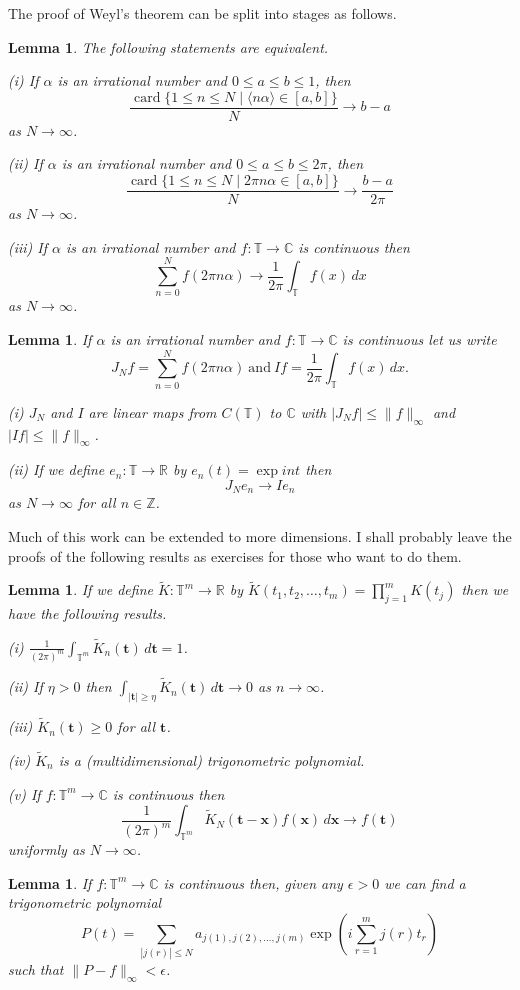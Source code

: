 \documentclass[12pt]{article}
\newtheorem{lemma}[theorem]{Lemma}
\theoremstyle{definition}
\newcommand{\card}{\operatorname{card}}
\begin{document}
The proof of Weyl's theorem can be split into stages as follows.
\begin{lemma} The following statements are equivalent.

(i) If $\alpha$ is an irrational
number and $0\leq a\leq b\leq 1$, then
\[\frac{\card\{1\leq n\leq N \mid \langle n\alpha\rangle
\in [a,b]\}}{N}
\rightarrow b-a\]
as $N\rightarrow\infty$.

(ii) If $\alpha$ is an irrational
number and $0\leq a\leq b\leq 2\pi$, then
\[\frac{\card\{1\leq n\leq N \mid  2\pi n\alpha
\in [a,b]\}}{N}
\rightarrow \frac{b-a}{2\pi}\]
as $N\rightarrow\infty$. 

(iii) If $\alpha$ is an irrational
number and $f:{\mathbb T}\rightarrow{\mathbb C}$
is continuous then
\[\sum_{n=0}^{N}f(2\pi n\alpha)\rightarrow
\frac{1}{2\pi}\int_{\mathbb T}f(x)\,dx\]
as $N\rightarrow\infty$.
\end{lemma}
\begin{lemma} If $\alpha$ is an irrational
number and $f:{\mathbb T}\rightarrow{\mathbb C}$
is continuous let us write
\[J_{N}f=\sum_{n=0}^{N}f(2\pi n\alpha)
\ \text{and}
\ If=\frac{1}{2\pi}\int_{\mathbb T}f(x)\,dx.\]

(i) $J_{N}$ and $I$ are linear maps from $C({\mathbb T})$
to ${\mathbb C}$ with $|J_{N}f|\leq\|f\|_{\infty}$
and $|If|\leq\|f\|_{\infty}$.

(ii) If we define $e_{n}:{\mathbb T}\rightarrow{\mathbb R}$
by $e_{n}(t)=\exp int$ then
\[J_{N}e_{n}\rightarrow Ie_{n}\]
as $N\rightarrow\infty$ for all $n\in{\mathbb Z}$.
\end{lemma}

Much of this work can be extended to more dimensions. I shall probably
leave the proofs of the following results as exercises for those
who want to do them.
\begin{lemma}\label{ L, many start}
If we define $\tilde{K}:{\mathbb T}^{m}\rightarrow{\mathbb R}$
by $\tilde{K}(t_{1},t_{2},\dots,t_{m})=\prod_{j=1}^{m}K(t_{j})$
then we have the following results.

(i) $\frac{1}{(2\pi)^{m}}\int_{{\mathbb T}^{m}}
\tilde{K}_{n}({\mathbf t})\, d{\mathbf t}=1$.

(ii) If $\eta>0$ then
$\int_{|{\mathbf t}|\geq\eta}\tilde{K}_{n}({\mathbf t})
\,d{\mathbf t}\rightarrow 0$
as $n\rightarrow\infty$.

(iii) $\tilde{K}_{n}({\mathbf t})\geq 0$ for all ${\mathbf t}$.

(iv) $\tilde{K}_{n}$ is a (multidimensional) trigonometric
polynomial.

(v) If $f:{\mathbb T}^{m}\rightarrow{\mathbb C}$ is continuous then
\[\frac{1}{(2\pi)^{m}}\int_{{\mathbb T}^{m}}
\tilde{K}_{N}({\mathbf t}-{\mathbf x})f({\mathbf x})\,d{\mathbf x}
\rightarrow f({\mathbf t})\]
uniformly as $N\rightarrow\infty$.
\end{lemma}
\begin{lemma} 
If $f:{\mathbb T}^{m}\rightarrow{\mathbb C}$ 
is continuous then, given any $\epsilon>0$ we can find a 
trigonometric polynomial 
\[P(t)=\sum_{|j(r)|\leq N}a_{j(1),j(2),\dots,j(m)}
\exp \left(i\sum_{r=1}^{m}j(r)t_{r}\right)\]
such that $\|P-f\|_{\infty}<\epsilon$.
\end{lemma}
\end{document}
